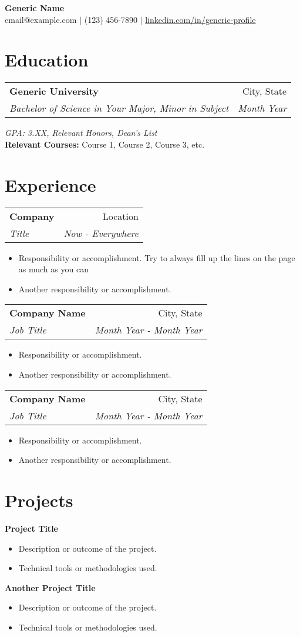 \documentclass[letterpaper,18pt]{article}
\makeatletter
\newcommand{\resumeSection}[1]{\vspace{-10pt} \section{#1}}
\newcommand{\resumeSubHeading}[4]{
    \vspace{-1pt}
    \begin{tabular*}{\textwidth}{l@{\extracolsep{\fill}}r}
        \textbf{#1} & #2 \vspace{-2pt} \\
        \textit{\small #3} & \textit{\small #4} \\
    \end{tabular*}
}
\newcommand{\resumeProject}[1]{\textbf{#1}\vspace{0pt}}
\newcommand{\resumeItemListStart}{\begin{itemize}[itemsep=0em]\vspace{-4pt}}
\newcommand{\resumeItemListEnd}{\end{itemize}\vspace{-5pt}}
\newcommand{\resumeItem}[1]{\vspace{-5pt}\item\small{ #1 }}
\newcommand{\resumeContact}[4]{
  \begin{center}
    \textbf{\Large #1} \\ %
    #2 $|$ #3 $|$ \href{#4}{linkedin.com/in/generic-profile}
  \end{center}
}
\makeatother
\begin{document}
\resumeContact{Generic Name}{email@example.com}{(123) 456-7890}{https://www.linkedin.com/in/generic-profile}

\vspace{-10pt}

\resumeSection{Education}
\resumeSubHeading{Generic University}{City, State}{Bachelor of Science in Your Major, Minor in Subject}{Month Year}
\textit{\small GPA: 3.XX, Relevant Honors, Dean's List} \\
\textbf{Relevant Courses:} Course 1, Course 2, Course 3, etc.

\resumeSection{Experience}

\resumeSubHeading{Company}{Location}{Title}{Now - Everywhere}
\resumeItemListStart
    \resumeItem{Responsibility or accomplishment. Try to always fill up the lines on the page as much as you can}
    \resumeItem{Another responsibility or accomplishment.}
\resumeItemListEnd


\resumeSubHeading{Company Name}{City, State}{Job Title}{Month Year - Month Year}
\resumeItemListStart
    \resumeItem{Responsibility or accomplishment.}
    \resumeItem{Another responsibility or accomplishment.}
\resumeItemListEnd

\resumeSubHeading{Company Name}{City, State}{Job Title}{Month Year - Month Year}
\resumeItemListStart
    \resumeItem{Responsibility or accomplishment.}
    \resumeItem{Another responsibility or accomplishment.}
\resumeItemListEnd

\resumeSection{Projects}
\resumeProject{Project Title}
\resumeItemListStart
    \resumeItem{Description or outcome of the project.}
    \resumeItem{Technical tools or methodologies used.}
\resumeItemListEnd

\resumeProject{Another Project Title}
\resumeItemListStart
    \resumeItem{Description or outcome of the project.}
    \resumeItem{Technical tools or methodologies used.}
\resumeItemListEnd
\end{document}
